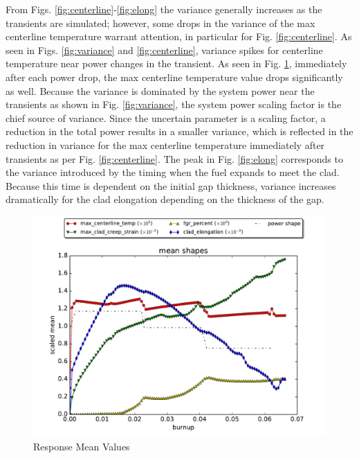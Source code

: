 \documentclass{anstrans} \usepackage{amsmath} \usepackage{amssymb}
\begin{document}
From Figs. \ref{fig:centerline}-\ref{fig:elong} the variance generally increases as the transients are simulated; however, some drops in the
variance of the max centerline temperature warrant attention, in particular for Fig. \ref{fig:centerline}.  As
seen in Figs. \ref{fig:variance} and \ref{fig:centerline}, variance spikes for centerline temperature near
power changes in the transient.
As seen in Fig. \ref{fig:mean}, immediately after each power drop, the max
centerline temperature value drops significantly as well.  Because the variance is dominated by the system power
near the transients as shown in Fig. \ref{fig:variance}, the system power scaling factor is the chief source of variance.
Since the uncertain
parameter is a scaling factor, a reduction in the total power results in a smaller variance, which is
reflected in the reduction in variance for the max centerline temperature immediately after transients as per
Fig. \ref{fig:centerline}.  The peak in Fig. \ref{fig:elong} corresponds to the variance introduced by the
timing when the fuel expands to meet the clad.  Because this time is dependent on the initial gap thickness,
variance increases dramatically for the clad elongation depending on the thickness of the gap.
\begin{figure}[htb]
  \centering
  \includegraphics[width=\linewidth]{./meanplots}
  \caption{Response Mean Values}
  \label{fig:mean}
\end{figure}
\end{document}
